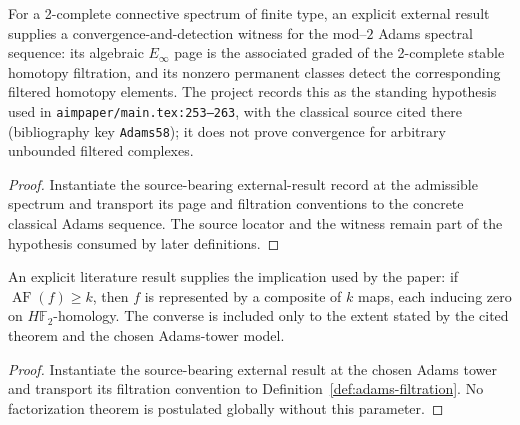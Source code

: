 \begin{theorem}
  \label{thm:external-classical-adams-convergence}
  \notready
  For a 2-complete connective spectrum of finite type, an explicit external
  result supplies a convergence-and-detection witness for the mod--$2$ Adams
  spectral sequence: its algebraic $E_\infty$ page is the associated graded of
  the 2-complete stable homotopy filtration, and its nonzero permanent classes
  detect the corresponding filtered homotopy elements.  The project records
  this as the standing hypothesis used in
  \texttt{aimpaper/main.tex:253--263}, with the classical source cited there
  (bibliography key \texttt{Adams58}); it does not prove convergence for
  arbitrary unbounded filtered complexes.
\end{theorem}

\begin{proof}
  Instantiate the source-bearing external-result record at the admissible
  spectrum and transport its page and filtration conventions to the concrete
  classical Adams sequence.  The source locator and the witness remain part of
  the hypothesis consumed by later definitions.
\end{proof}

\begin{theorem}
  \label{thm:external-map-filtration-factorization}
  \notready
  An explicit literature result supplies the implication used by the paper:
  if $\operatorname{AF}(f)\ge k$, then $f$ is represented by a composite of
  $k$ maps, each inducing zero on $H\mathbb F_2$-homology.  The converse is
  included only to the extent stated by the cited theorem and the chosen
  Adams-tower model.
\end{theorem}

\begin{proof}
  Instantiate the source-bearing external result at the chosen Adams tower and
  transport its filtration convention to Definition~\ref{def:adams-filtration}.
  No factorization theorem is postulated globally without this parameter.
\end{proof}

